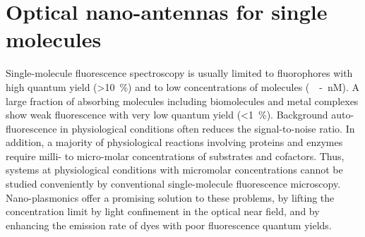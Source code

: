 \section{Optical nano-antennas for single molecules}
Single-molecule fluorescence spectroscopy is usually limited to fluorophores with high quantum yield (\SI{>10}{\percent}) and to low concentrations of molecules (\SI{}{\pM-nM}).
A large fraction of absorbing molecules including biomolecules and metal complexes show weak fluorescence with very low quantum yield (\SI{<1}{\percent}).
Background auto-fluorescence in physiological conditions often reduces the signal-to-noise ratio.
In addition, a majority of physiological reactions involving proteins and enzymes require milli- to micro-molar concentrations of substrates and cofactors.\cite{craighead2006future,punj2013gold,fabrizio2016roadmap,punj2014thesis}
Thus, systems at physiological conditions with micromolar concentrations cannot be studied conveniently by conventional single-molecule fluorescence microscopy.
Nano-plasmonics offer a promising solution to these problems, by lifting the concentration limit by light confinement in the optical near field, and by enhancing the emission rate of dyes with poor fluorescence quantum yields.

